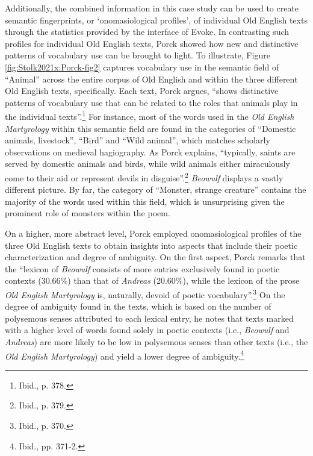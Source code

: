 Additionally, the combined information in this case study can be used to create semantic fingerprints, or `onomasiological profiles', of individual Old English texts through the statistics provided by the interface of Evoke. In contrasting such profiles for individual Old English texts, Porck showed how new and distinctive patterns of vocabulary use can be brought to light. To illustrate, Figure \ref{fig:Stolk2021x:Porck-fig2} captures vocabulary use in the semantic field of ``Animal'' across the entire corpus of Old English and within the three different Old English texts, specifically. Each text, Porck argues, ``shows distinctive patterns of vocabulary use that can be related to the roles that animals play in the individual texts''.\footnote{Ibid., p. 378.} For instance, most of the words used in the \textit{Old English Martyrology} within this semantic field are found in the categories of ``Domestic animals, livestock'', ``Bird'' and ``Wild animal'', which matches scholarly observations on medieval hagiography. As Porck explains, ``typically, saints are served by domestic animals and birds, while wild animals either miraculously come to their aid or represent devils in disguise''.\footnote{Ibid., p. 379.} \textit{Beowulf} displays a vastly different picture. By far, the category of ``Monster, strange creature'' contains the majority of the words used within this field, which is unsurprising given the prominent role of monsters within the poem.

On a higher, more abstract level, Porck employed onomasiological profiles of the three Old English texts to obtain insights into aspects that include their poetic characterization and degree of ambiguity. On the first aspect, Porck remarks that the ``lexicon of \textit{Beowulf} consists of more entries exclusively found in poetic contexts (30.66\%) than that of \textit{Andreas} (20.60\%), while the lexicon of the prose \textit{Old English Martyrology} is, naturally, devoid of poetic vocabulary''.\footnote{Ibid., p. 370.} On the degree of ambiguity found in the texts, which is based on the number of polysemous senses attributed to each lexical entry, he notes that texts marked with a higher level of words found solely in poetic contexts (i.e., \textit{Beowulf} and \textit{Andreas}) are more likely to be low in polysemous senses than other texts (i.e., the \textit{Old English Martyrology}) and yield a lower degree of ambiguity.\footnote{Ibid., pp. 371-2.}


